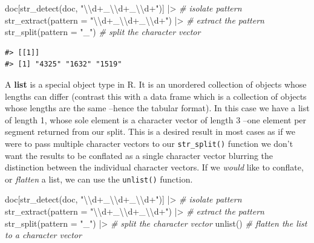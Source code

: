 \documentclass[
  letterpaper,
]{scrbook}
\newenvironment{Shaded}{\begin{snugshade}}{\end{snugshade}}
\newcommand{\AttributeTok}[1]{\textcolor[rgb]{0.00,0.00,0.00}{#1}}
\newcommand{\CommentTok}[1]{\textcolor[rgb]{0.00,0.00,0.00}{\textit{#1}}}
\newcommand{\FunctionTok}[1]{\textcolor[rgb]{0.00,0.00,0.00}{#1}}
\newcommand{\NormalTok}[1]{\textcolor[rgb]{0.00,0.00,0.00}{#1}}
\newcommand{\SpecialCharTok}[1]{\textcolor[rgb]{0.00,0.00,0.00}{#1}}
\newcommand{\StringTok}[1]{\textcolor[rgb]{0.00,0.00,0.00}{#1}}
\begin{document}
\begin{Shaded}
\begin{Highlighting}[]
\NormalTok{doc[}\FunctionTok{str\_detect}\NormalTok{(doc, }\StringTok{"}\SpecialCharTok{\textbackslash{}\textbackslash{}}\StringTok{d+\_}\SpecialCharTok{\textbackslash{}\textbackslash{}}\StringTok{d+\_}\SpecialCharTok{\textbackslash{}\textbackslash{}}\StringTok{d+"}\NormalTok{)] }\SpecialCharTok{|\textgreater{}} \CommentTok{\# isolate pattern}
  \FunctionTok{str\_extract}\NormalTok{(}\AttributeTok{pattern =} \StringTok{"}\SpecialCharTok{\textbackslash{}\textbackslash{}}\StringTok{d+\_}\SpecialCharTok{\textbackslash{}\textbackslash{}}\StringTok{d+\_}\SpecialCharTok{\textbackslash{}\textbackslash{}}\StringTok{d+"}\NormalTok{) }\SpecialCharTok{|\textgreater{}} \CommentTok{\# extract the pattern}
  \FunctionTok{str\_split}\NormalTok{(}\AttributeTok{pattern =} \StringTok{"\_"}\NormalTok{) }\CommentTok{\# split the character vector}
\end{Highlighting}
\end{Shaded}

\begin{verbatim}
#> [[1]]
#> [1] "4325" "1632" "1519"
\end{verbatim}

A \textbf{list} is a special object type in R. It is an unordered
collection of objects whose lengths can differ (contrast this with a
data frame which is a collection of objects whose lengths are the same
--hence the tabular format). In this case we have a list of length 1,
whose sole element is a character vector of length 3 --one element per
segment returned from our split. This is a desired result in most cases
as if we were to pass multiple character vectors to our
\texttt{str\_split()} function we don't want the results to be conflated
as a single character vector blurring the distinction between the
individual character vectors. If we \emph{would} like to conflate, or
\emph{flatten} a list, we can use the \texttt{unlist()} function.

\begin{Shaded}
\begin{Highlighting}[]
\NormalTok{doc[}\FunctionTok{str\_detect}\NormalTok{(doc, }\StringTok{"}\SpecialCharTok{\textbackslash{}\textbackslash{}}\StringTok{d+\_}\SpecialCharTok{\textbackslash{}\textbackslash{}}\StringTok{d+\_}\SpecialCharTok{\textbackslash{}\textbackslash{}}\StringTok{d+"}\NormalTok{)] }\SpecialCharTok{|\textgreater{}} \CommentTok{\# isolate pattern}
  \FunctionTok{str\_extract}\NormalTok{(}\AttributeTok{pattern =} \StringTok{"}\SpecialCharTok{\textbackslash{}\textbackslash{}}\StringTok{d+\_}\SpecialCharTok{\textbackslash{}\textbackslash{}}\StringTok{d+\_}\SpecialCharTok{\textbackslash{}\textbackslash{}}\StringTok{d+"}\NormalTok{) }\SpecialCharTok{|\textgreater{}} \CommentTok{\# extract the pattern}
  \FunctionTok{str\_split}\NormalTok{(}\AttributeTok{pattern =} \StringTok{"\_"}\NormalTok{) }\SpecialCharTok{|\textgreater{}} \CommentTok{\# split the character vector}
  \FunctionTok{unlist}\NormalTok{() }\CommentTok{\# flatten the list to a character vector}
\end{Highlighting}
\end{Shaded}
\end{document}

